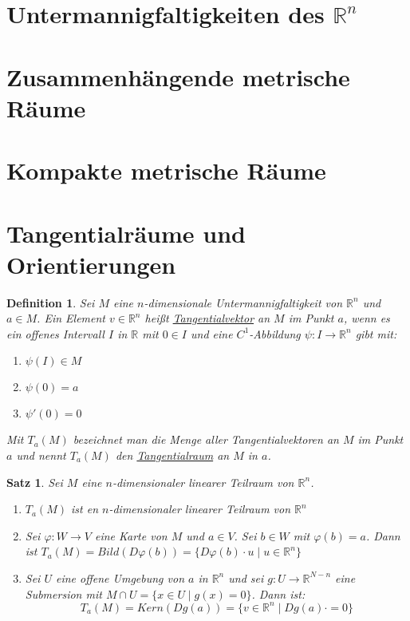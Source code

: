 \documentclass[10pt,a4paper]{report}
\newtheorem{defi*}{Definition}
\newtheorem{satz}{Satz}
\begin{document}
\section{Untermannigfaltigkeiten des $\mathbb{R}^{n}$}

\section{Zusammenhängende metrische Räume}

\section{Kompakte metrische Räume}

\section{Tangentialräume und Orientierungen}

\begin{defi*}
  Sei $M$ eine $n$-dimensionale Untermannigfaltigkeit von $\mathbb{R}^{n}$ und $a \in M$.
  Ein Element $v \in \mathbb{R}^{n}$ heißt \underline{Tangentialvektor} an $M$ im Punkt $a$, wenn es ein offenes Intervall $I$ in $\mathbb{R}$ mit $0 \in I$ und eine $C^{1}$-Abbildung $\psi : I \rightarrow \mathbb{R}^{n}$ gibt mit:
  \begin{enumerate}
    \item $\psi(I) \in M$
    \item $\psi(0) = a$
    \item $\psi'(0) = 0$
  \end{enumerate}
  Mit $T_{a}(M)$ bezeichnet man die Menge aller Tangentialvektoren an $M$ im Punkt $a$ und nennt $T_{a}(M)$ den \underline{Tangentialraum} an $M$ in $a$.
\end{defi*}

\begin{satz}
  Sei $M$ eine $n$-dimensionaler linearer Teilraum von $\mathbb{R}^{n}$.
  \begin{enumerate}
    \item $T_{a}(M)$ ist en $n$-dimensionaler linearer Teilraum von $\mathbb{R}^{n}$
    \item Sei $\varphi : W \rightarrow V$ eine Karte von $M$ und $a \in V$. Sei $b \in W$ mit $\varphi(b) = a$. Dann ist $T_{a}(M) = Bild(D\varphi(b)) = \{ D\varphi(b) \cdot u \mid u \in \mathbb{R}^{n} \}$
    \item Sei $U$ eine offene Umgebung von $a$ in $\mathbb{R}^{n}$ und sei $g : U \rightarrow \mathbb{R}^{N - n}$ eine Submersion mit $M \cap U = \{ x \in U \mid g(x) = 0 \}$.
      Dann ist:
      \begin{equation}
        T_{a}(M) = Kern(Dg(a)) = \{ v \in \mathbb{R}^{n} \mid Dg(a) \cdot = 0 \}
      \end{equation}
  \end{enumerate}
\end{satz}
\end{document}
